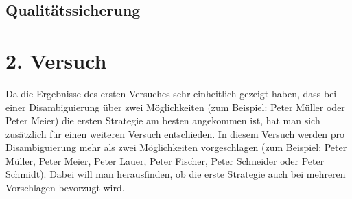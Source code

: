\documentclass[12pt,a4paper]{scrartcl}
\begin{document}

\subsection{Qualitätssicherung}


\section{2. Versuch}
Da die Ergebnisse des ersten Versuches sehr einheitlich gezeigt haben, dass bei einer Disambiguierung über zwei Möglichkeiten (zum Beispiel: Peter Müller oder Peter Meier) die ersten Strategie am besten angekommen ist, hat man sich zusätzlich für einen weiteren Versuch entschieden. In diesem Versuch werden pro Disambiguierung mehr als zwei Möglichkeiten vorgeschlagen (zum Beispiel: Peter Müller, Peter Meier, Peter Lauer, Peter Fischer, Peter Schneider oder Peter Schmidt). Dabei will man herausfinden, ob die erste Strategie auch bei mehreren Vorschlagen bevorzugt wird.
\end{document}

